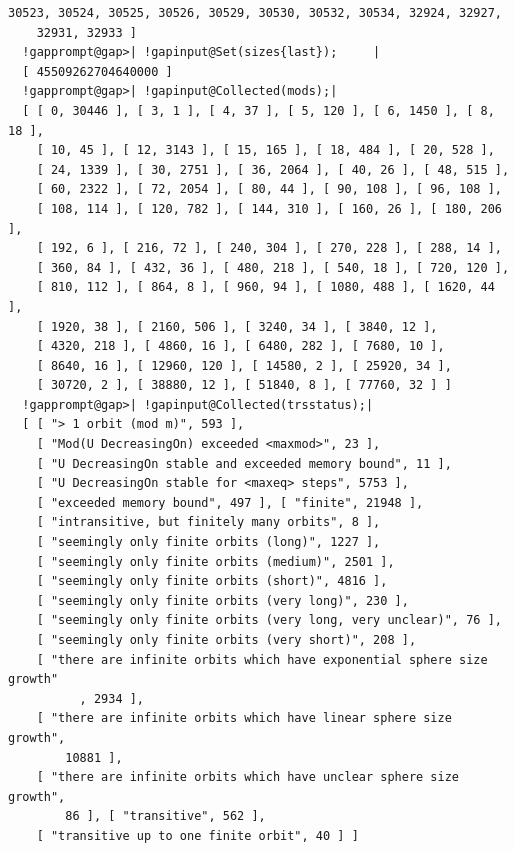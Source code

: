 \documentclass[a4paper,11pt]{report}
\begin{document}
{{{\begin{Verbatim}[commandchars=!@|,fontsize=\small,frame=single,label=Example]
    30523, 30524, 30525, 30526, 30529, 30530, 30532, 30534, 32924, 32927, 
    32931, 32933 ]
  !gapprompt@gap>| !gapinput@Set(sizes{last});     |
  [ 45509262704640000 ]
  !gapprompt@gap>| !gapinput@Collected(mods);|
  [ [ 0, 30446 ], [ 3, 1 ], [ 4, 37 ], [ 5, 120 ], [ 6, 1450 ], [ 8, 18 ], 
    [ 10, 45 ], [ 12, 3143 ], [ 15, 165 ], [ 18, 484 ], [ 20, 528 ], 
    [ 24, 1339 ], [ 30, 2751 ], [ 36, 2064 ], [ 40, 26 ], [ 48, 515 ], 
    [ 60, 2322 ], [ 72, 2054 ], [ 80, 44 ], [ 90, 108 ], [ 96, 108 ], 
    [ 108, 114 ], [ 120, 782 ], [ 144, 310 ], [ 160, 26 ], [ 180, 206 ], 
    [ 192, 6 ], [ 216, 72 ], [ 240, 304 ], [ 270, 228 ], [ 288, 14 ], 
    [ 360, 84 ], [ 432, 36 ], [ 480, 218 ], [ 540, 18 ], [ 720, 120 ], 
    [ 810, 112 ], [ 864, 8 ], [ 960, 94 ], [ 1080, 488 ], [ 1620, 44 ], 
    [ 1920, 38 ], [ 2160, 506 ], [ 3240, 34 ], [ 3840, 12 ], 
    [ 4320, 218 ], [ 4860, 16 ], [ 6480, 282 ], [ 7680, 10 ], 
    [ 8640, 16 ], [ 12960, 120 ], [ 14580, 2 ], [ 25920, 34 ], 
    [ 30720, 2 ], [ 38880, 12 ], [ 51840, 8 ], [ 77760, 32 ] ]
  !gapprompt@gap>| !gapinput@Collected(trsstatus);|
  [ [ "> 1 orbit (mod m)", 593 ], 
    [ "Mod(U DecreasingOn) exceeded <maxmod>", 23 ], 
    [ "U DecreasingOn stable and exceeded memory bound", 11 ], 
    [ "U DecreasingOn stable for <maxeq> steps", 5753 ], 
    [ "exceeded memory bound", 497 ], [ "finite", 21948 ], 
    [ "intransitive, but finitely many orbits", 8 ], 
    [ "seemingly only finite orbits (long)", 1227 ], 
    [ "seemingly only finite orbits (medium)", 2501 ], 
    [ "seemingly only finite orbits (short)", 4816 ], 
    [ "seemingly only finite orbits (very long)", 230 ], 
    [ "seemingly only finite orbits (very long, very unclear)", 76 ], 
    [ "seemingly only finite orbits (very short)", 208 ], 
    [ "there are infinite orbits which have exponential sphere size growth"
          , 2934 ], 
    [ "there are infinite orbits which have linear sphere size growth", 
        10881 ],
    [ "there are infinite orbits which have unclear sphere size growth", 
        86 ], [ "transitive", 562 ], 
    [ "transitive up to one finite orbit", 40 ] ]
  
\end{Verbatim}
 }

 

}}
\end{document}
